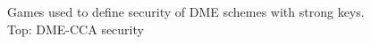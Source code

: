 \begin{figure}[t]
\center
{} 
\caption{Games used to define security of DME schemes with strong keys. Top: DME-CCA security}
\label{fig:} 
\end{figure}


